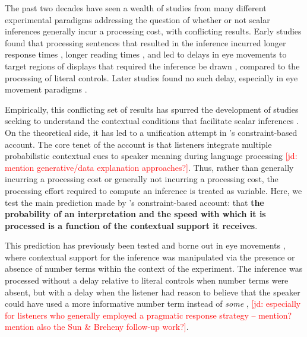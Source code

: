\documentclass[10pt,letterpaper]{article}
\newcommand{\jd}[1]{\textcolor{Red}{[jd: #1]}}
\begin{document}
The past two decades have seen a wealth of studies from many different experimental paradigms addressing the question of whether or not scalar inferences generally incur a processing cost, with conflicting results. Early studies found that processing sentences that resulted in the inference incurred longer response times \cite{BottNoveck2004, TomlinsonEtAl2012,DegenTanenhaus2015}, longer reading times \cite{BrehenyEtAl2006}, and led to delays in eye movements to target regions of displays that required the inference be drawn \cite{HuangSnedeker2009,HuangSnedeker2011,DegenTanenhaus2016}, compared to the processing of literal controls. Later studies found no such delay, especially in eye movement paradigms \cite{Grodner2010,Breheny2013,DegenTanenhaus2016,SunBreheny2019}. 

Empirically, this conflicting set of results has spurred the development of studies seeking to understand the contextual conditions that facilitate scalar inferences \cite{Zondervan2010,Degen2015,Augurzky2019,MartyChemla2013,DegenGoodman2014}. On the theoretical side, it has led to a unification attempt in 's constraint-based account. The core tenet of the account is that listeners integrate multiple probabilistic contextual cues to speaker meaning during language processing \jd{mention generative/data explanation approaches?}. Thus, rather than generally incurring a processing cost or generally not incurring a processing cost, the processing effort required to compute an inference is treated as variable. Here, we test the main prediction made by 's constraint-based account: that \textbf{the probability of an interpretation and the speed with which it is processed is a function of the contextual support it receives}. 

This prediction has previously been tested and borne out in eye movements \cite{DegenTanenhaus2016}, where contextual support for the inference was manipulated via the presence or absence of number terms within the context of the experiment. The inference was processed without a delay relative to literal controls when number terms were absent, but with a delay when the listener had reason to believe that the speaker could have used a more informative number term instead of \emph{some} \cite{DegenTanenhaus2016}, \jd{especially for listeners who generally employed a pragmatic response strategy -- mention? mention also the Sun \& Breheny follow-up work?}.
\end{document}
